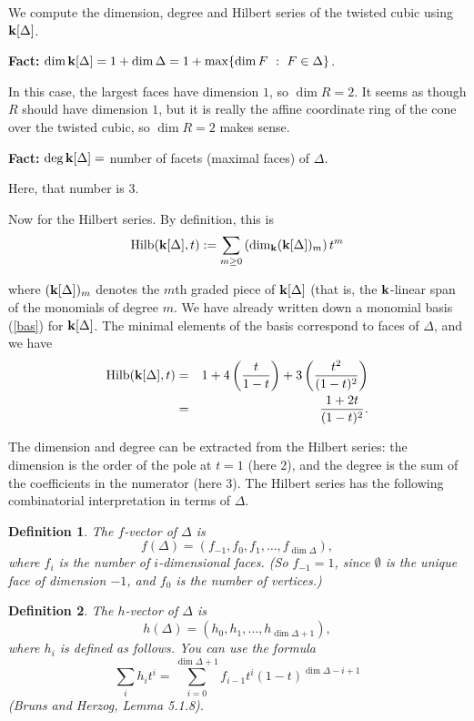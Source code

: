 \documentclass{amsart}
\newtheorem{defn}{Definition}
\newcommand{\Hilb}{\mathop{\rm Hilb}\nolimits}
\newcommand{\fld}{{\bf k}}
\newcommand{\defterm}[1] {{\it #1\/}}
\begin{document}
We compute the dimension, degree and Hilbert series of the twisted cubic using $\fld[\Delta]$.

{\bf Fact:} $\dim \fld[\Delta] = 1 + \dim \Delta = 1 + \max \{ \dim F ~:~ F \in \Delta\}$.  

In this case, the largest faces have dimension $1$, so $\dim R = 2$.  It seems as though $R$
should have dimension $1$, but it is really the affine coordinate ring of the cone over the
twisted cubic, so $\dim R = 2$ makes sense.

{\bf Fact:} $\deg \fld[\Delta] =$ number of facets (maximal faces) of $\Delta$.

Here, that number is $3$.

Now for the Hilbert series.  By definition, this is
	$$\Hilb(\fld[\Delta],t) := \sum_{m \geq 0} \left( \dim_\fld (\fld[\Delta])_m \right) 
	t^m$$

where $(\fld[\Delta])_m$ denotes the $m$th graded piece of $\fld[\Delta]$ (that is, the
$\fld$-linear span of the monomials of degree $m$.  We have already written down a 
monomial basis (\ref{bas}) for $\fld[\Delta]$.  The minimal elements of the basis
correspond to faces of $\Delta$, and we have
	\begin{eqnarray*}
	\Hilb(\fld[\Delta],t)
	&=& 1 + 4\left(\frac{t}{1-t}\right) + 3\left(\frac{t^2}{(1-t)^2}\right) \\
	&=& \frac{1+2t}{(1-t)^2}.
	\end{eqnarray*}

The dimension and degree can be extracted from the Hilbert series: the dimension is the order 
of the pole at $t=1$ (here $2$), and the degree is the sum of the coefficients in the 
numerator (here $3$).  The Hilbert series has the following combinatorial interpretation in 
terms of $\Delta$.

\begin{defn}
The \defterm{$f$-vector} of $\Delta$ is
	$$f(\Delta) = \left( f_{-1}, f_0, f_1, \dots, f_{\dim\Delta} \right),$$
where $f_i$ is the number of $i$-dimensional faces.  (So $f_{-1}=1$, since $\emptyset$ is the 
unique face of dimension $-1$, and $f_0$ is the number of vertices.)
\end{defn}

\begin{defn}
The \defterm{$h$-vector} of $\Delta$ is
	$$h(\Delta) = \left( h_0, h_1, \dots, h_{\dim\Delta+1} \right),$$
where $h_i$ is defined as follows.  You can use the formula
	$$\sum_i h_it^i = \sum_{i=0}^{\dim\Delta+1} f_{i-1}t^i(1-t)^{\dim\Delta-i+1}$$
(Bruns and Herzog, Lemma 5.1.8).
\end{defn}
\end{document}
